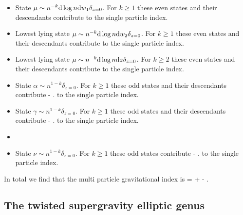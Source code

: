 \documentclass[../main.tex]{subfiles}
\begin{document}
\begin{itemize} 
\item State $\mu \sim n^{-k} \mathrm{d} \log n \mathrm{d} w_1 \delta_{z=0}$.
For $k \geq 1$ these even states and their descendants contribute
\beqn
{} 
\eeqn
to the single particle index. 
\item Lowest lying state $\mu \sim n^{-k} \mathrm{d} \log n \mathrm{d} w_2 \delta_{z=0}$.
For $k \geq 1$ these even states and their descendants contribute
\beqn
{} 
\eeqn
to the single particle index. 
\item Lowest lying state $\mu \sim n^{-k} \mathrm{d} \log n \mathrm{d} z \delta_{z=0}$.
For $k \geq 2$ these even states and their descendants contribute 
\beqn
{} 
\eeqn
to the single particle index. 
\item State $\alpha \sim n^{1-k}\delta_{z=0}$. 
For $k \geq 1$ these odd states and their descendants contribute 
\beqn
-  .
\eeqn
to the single particle index.
\item State $\gamma \sim n^{1-k}\delta_{z=0}$. 
For $k \geq 1$ these odd states and their descendants contribute 
\beqn
-  .
\eeqn
to the single particle index.
\item \item State $\nu \sim n^{1-k}\delta_{z=0}$. 
For $k \geq 1$ these odd states contribute 
\beqn
-  .
\eeqn
to the single particle index.
\end{itemize}

In total we find that the multi particle gravitational index is 
\beqn
{} =  +  -  .
\eeqn



%

\subsection{The twisted supergravity elliptic genus}
\end{document}
